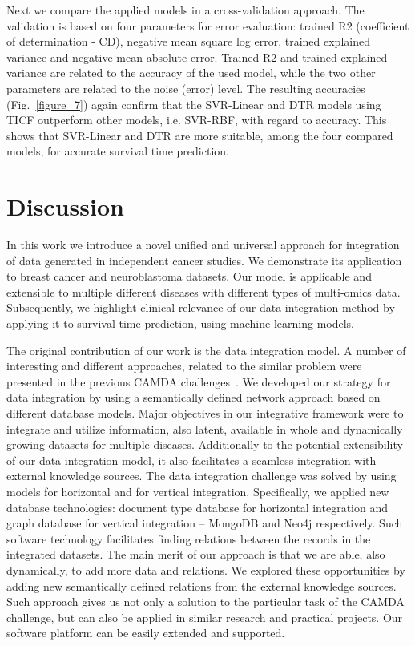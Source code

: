 \documentclass{bmcart}
\begin{document}
Next we compare the applied models in a cross-validation approach. The
validation is based on four parameters for error evaluation: trained R2
(coefficient of determination - CD), negative mean square log error,
trained explained variance and negative mean absolute error. Trained R2
and trained explained variance are related to the accuracy of the used
model, while the two other parameters are related to the noise (error)
level. The resulting accuracies (Fig.~\ref{figure_7}) again confirm that the
SVR-Linear and DTR models using TICF outperform other models, i.e.
SVR-RBF, with regard to accuracy. This shows that SVR-Linear and DTR
are more suitable, among the four compared models, for accurate
survival time prediction.

\section{Discussion}

In this work we introduce a novel unified and universal approach for
integration of data generated in independent cancer studies. We
demonstrate its application to breast cancer and neuroblastoma
datasets. Our model is applicable and extensible to multiple different
diseases with different types of multi-omics data. Subsequently, we
highlight clinical relevance of our data integration method by applying
it to survival time prediction, using machine learning models.

The original contribution of our work is the data integration model. A
number of  interesting and different approaches, related to the similar
problem were presented in the previous CAMDA challenges~\cite{35}. We
developed our strategy for data integration by using a semantically
defined network approach based on different database models. Major
objectives in our integrative framework were to integrate and utilize
information, also latent, available in whole and dynamically growing
datasets for multiple diseases. Additionally to the potential
extensibility of our data integration model, it also facilitates a
seamless integration with external knowledge sources. The data
integration challenge was solved by using models for horizontal and for
vertical integration. Specifically, we applied new database
technologies: document type database for horizontal integration and
graph database for vertical integration -- MongoDB and Neo4j
respectively. Such software technology facilitates finding relations
between the records in the integrated datasets. The main merit of our
approach is that we are able, also dynamically, to add more data and
relations. We explored these opportunities by adding new semantically
defined relations from the external knowledge sources. Such approach
gives us not only a solution to the particular task of the CAMDA
challenge, but can also be applied in similar research and practical
projects. Our software platform can be easily extended and supported.
\end{document}
